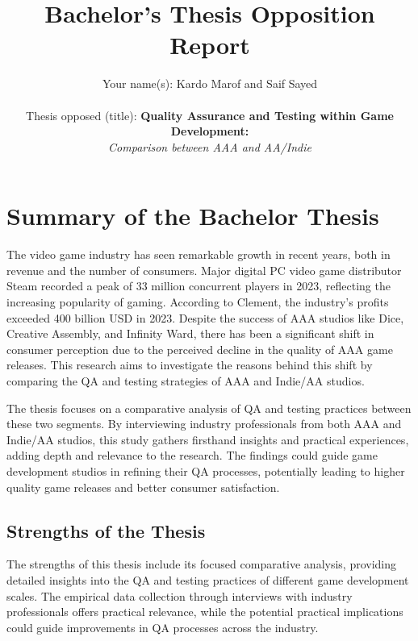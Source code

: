 \documentclass[conference]{IEEEtran}
\begin{document}
\title{Bachelor's Thesis Opposition Report}

\author{Your name(s):  Kardo Marof and Saif Sayed\\ \\
Thesis opposed (title): \textbf{Quality Assurance and Testing within Game Development:} \\
			       \quad\textit{Comparison between AAA and AA/Indie}
}

\maketitle


\section{Summary of the Bachelor Thesis}
The video game industry has seen remarkable growth in recent years, both in revenue and the number of consumers. Major digital PC video game distributor Steam recorded a peak of 33 million concurrent players in 2023, reflecting the increasing popularity of gaming. According to Clement, the industry's profits exceeded 400 billion USD in 2023. Despite the success of AAA studios like Dice, Creative Assembly, and Infinity Ward, there has been a significant shift in consumer perception due to the perceived decline in the quality of AAA game releases. This research aims to investigate the reasons behind this shift by comparing the QA and testing strategies of AAA and Indie/AA studios.

The thesis focuses on a comparative analysis of QA and testing practices between these two segments. By interviewing industry professionals from both AAA and Indie/AA studios, this study gathers firsthand insights and practical experiences, adding depth and relevance to the research. The findings could guide game development studios in refining their QA processes, potentially leading to higher quality game releases and better consumer satisfaction.

\subsection{Strengths of the Thesis}
The strengths of this thesis include its focused comparative analysis, providing detailed insights into the QA and testing practices of different game development scales. The empirical data collection through interviews with industry professionals offers practical relevance, while the potential practical implications could guide improvements in QA processes across the industry.
\end{document}
